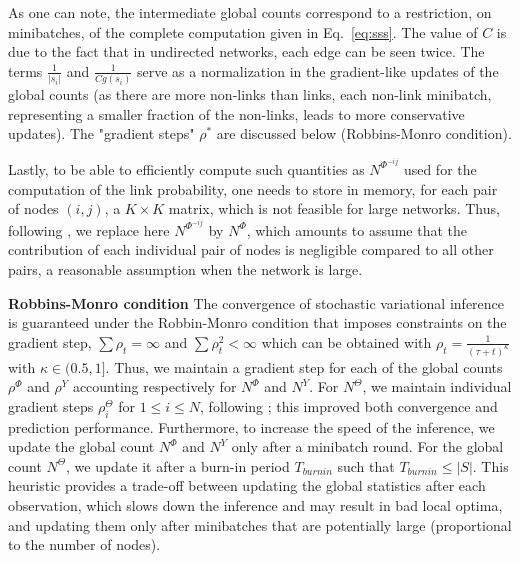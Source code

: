 %
As one can note, the intermediate global counts correspond to a restriction, on minibatches, of the complete computation given in Eq.~\ref{eq:sss}. The value of $C$ is due to the fact that in undirected networks, each edge can be seen twice. The terms $\frac{1}{|s_i|}$ and $\frac{1}{Cg(s_i)}$ serve as a normalization in the gradient-like updates of the global counts (as there are more non-links than links, each non-link minibatch, representing a smaller fraction of the non-links, leads to more conservative updates). The "gradient steps" $\rho^*$ are discussed below (Robbins-Monro condition).

Lastly, to be able to efficiently compute such quantities as $N^{\Phi^{-ij}}$ used for the computation of the link probability, one needs to store in memory, for each pair of nodes $(i,j)$, a $K \times K$ matrix, which is not feasible for large networks. Thus, following \cite{foulds2013stochastic}, we replace here $N^{\Phi^{-ij}}$ by $N^{\Phi}$, which amounts to assume that the contribution of each individual pair of nodes is negligible compared to all other pairs, a reasonable assumption when the network is large. %

\textbf{Robbins-Monro condition} The convergence of stochastic variational inference is guaranteed under the Robbin-Monro condition \cite{robbins1951stochastic} that imposes constraints on the gradient step, $\sum \rho_t = \infty$ and $\sum \rho_t^2 < \infty$ which can be obtained with $\rho_t = \frac{1}{(\tau +t)^\kappa}$ with $\kappa \in (0.5, 1]$. Thus, we maintain a gradient step for each of the global counts $\rho^\Phi$ and $\rho^Y$ accounting respectively for  $N^\Phi$ and $N^Y$. For $N^\Theta$, we maintain individual gradient steps $\rho_i^{\Theta}$ for $1\leq i\leq N$, following \cite{miller2009nonparametric}; this improved both convergence and prediction performance. Furthermore, to increase the speed of the inference, we update the global count $N^\Phi$ and $N^Y$ only after a minibatch round. For the global count  $N^\Theta$, we update it after a burn-in period $T_{burnin}$ such that $T_{burnin} \leq |S|$.
This heuristic provides a trade-off between updating the global statistics after each observation, which slows down the inference and may result in bad local optima, and updating them only after minibatches that are potentially large (proportional to the number of nodes).

